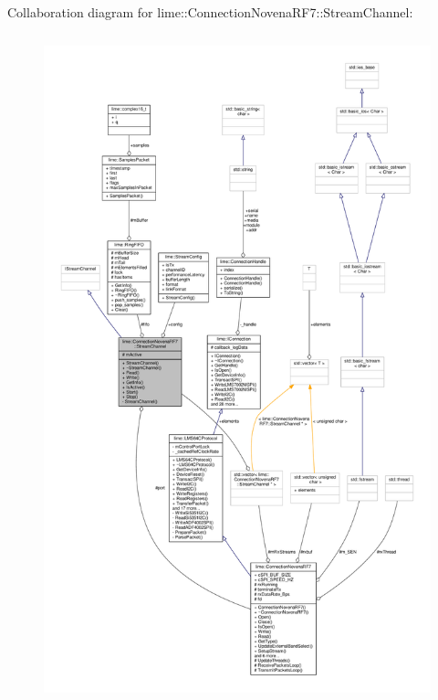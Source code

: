 Collaboration diagram for lime\+:\+:Connection\+Novena\+R\+F7\+:\+:Stream\+Channel\+:
\nopagebreak
\begin{figure}[H]
\begin{center}
\leavevmode
\includegraphics[height=550pt]{d7/d42/classlime_1_1ConnectionNovenaRF7_1_1StreamChannel__coll__graph}
\end{center}
\end{figure}
